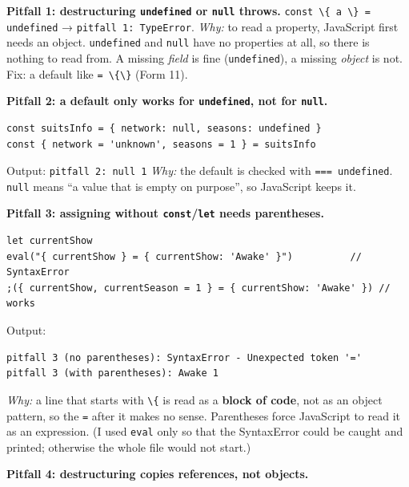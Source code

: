 \documentclass[
  10pt,
]{article}
\newcommand{\passthrough}[1]{#1}
\begin{document}
\textbf{Pitfall 1: destructuring \passthrough{\lstinline!undefined!} or
\passthrough{\lstinline!null!} throws.}
\passthrough{\lstinline!const \{ a \} = undefined!} →
\passthrough{\lstinline!pitfall 1: TypeError!}. \emph{Why:} to read a
property, JavaScript first needs an object.
\passthrough{\lstinline!undefined!} and \passthrough{\lstinline!null!}
have no properties at all, so there is nothing to read from. A missing
\emph{field} is fine (\passthrough{\lstinline!undefined!}), a missing
\emph{object} is not. Fix: a default like
\passthrough{\lstinline!= \{\}!} (Form 11).

\textbf{Pitfall 2: a default only works for
\passthrough{\lstinline!undefined!}, not for
\passthrough{\lstinline!null!}.}

\begin{lstlisting}
const suitsInfo = { network: null, seasons: undefined }
const { network = 'unknown', seasons = 1 } = suitsInfo
\end{lstlisting}

Output: \passthrough{\lstinline!pitfall 2: null 1!} \emph{Why:} the
default is checked with \passthrough{\lstinline!=== undefined!}.
\passthrough{\lstinline!null!} means ``a value that is empty on
purpose'', so JavaScript keeps it.

\textbf{Pitfall 3: assigning without
\passthrough{\lstinline!const!}/\passthrough{\lstinline!let!} needs
parentheses.}

\begin{lstlisting}
let currentShow
eval("{ currentShow } = { currentShow: 'Awake' }")          // SyntaxError
;({ currentShow, currentSeason = 1 } = { currentShow: 'Awake' }) // works
\end{lstlisting}

Output:

\begin{lstlisting}
pitfall 3 (no parentheses): SyntaxError - Unexpected token '='
pitfall 3 (with parentheses): Awake 1
\end{lstlisting}

\emph{Why:} a line that starts with \passthrough{\lstinline!\{!} is read
as a \textbf{block of code}, not as an object pattern, so the
\passthrough{\lstinline!=!} after it makes no sense. Parentheses force
JavaScript to read it as an expression. (I used
\passthrough{\lstinline!eval!} only so that the SyntaxError could be
caught and printed; otherwise the whole file would not start.)

\textbf{Pitfall 4: destructuring copies references, not objects.}
\end{document}
